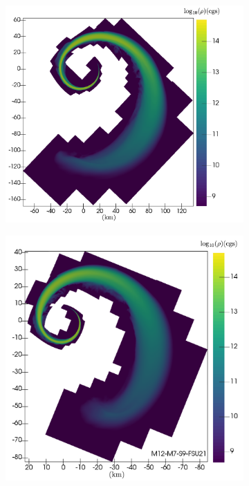 \begin{figure}
	\centering
	\begin{subfigure}[b]{0.475\textwidth}
		\centering
		\includegraphics[width=1.0\linewidth]{images/rho_DD2_M12-merger-inertial}
		\label{fig:rho_M12_DD2}
	\end{subfigure}
	\begin{subfigure}[b]{0.475\textwidth}
		\centering
		\includegraphics[width=\linewidth]{images/rho_FSU21_M12-merger-inertial}

\end{subfigure}
\end{figure}
